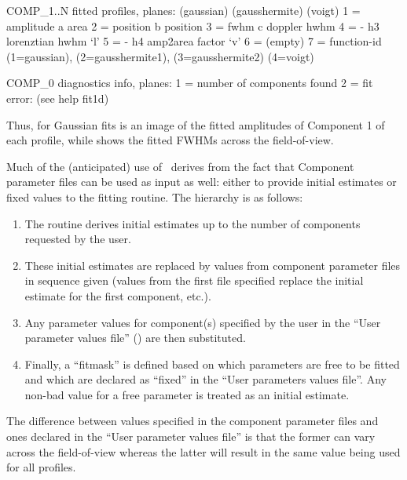 \documentclass[oneside,11pt]{starlink}
\begin{document}
\begin{terminalv}
    COMP_1..N fitted profiles, planes:
               (gaussian)          (gausshermite)        (voigt)
         1 =   amplitude                a                 area
         2 =   position                 b               position
         3 =     fwhm                   c             doppler hwhm
         4 =       -                    h3           lorenztian hwhm `l'
         5 =       -                    h4           amp2area factor `v'
         6 =   (empty)
         7 = function-id (1=gaussian), (2=gausshermite1), (3=gausshermite2)
                         (4=voigt)

    COMP_0 diagnostics info, planes:
         1 = number of components found
         2 = fit error: (see help fit1d)
\end{terminalv}

Thus, for Gaussian fits  is
an image of the fitted amplitudes of Component 1 of each profile,
while  shows the fitted FWHMs
across the field-of-view.

Much of the (anticipated) use of \fitdd\ derives from the fact that
Component parameter files can be used as input as well: either to
provide initial estimates or fixed values to the fitting routine.
The hierarchy is as follows:
\begin{enumerate}
\item The routine derives initial estimates up to the number of components
requested by the user.
\item These initial estimates are replaced by values from component parameter
files in sequence given (values from the first file specified replace
the initial estimate for the first component, etc.).
\item Any parameter values for component(s) specified by the user in
the ``User parameter values file'' () are then substituted.
\item Finally, a ``fitmask'' is defined based on which parameters are
free to be fitted and which are declared as ``fixed'' in the ``User
parameters values file''. Any non-bad value for a free parameter is treated
as an initial estimate.
\end{enumerate}

The difference between values specified in the component parameter
files and ones declared in the ``User parameter values file'' is that
the former can vary across the field-of-view whereas the latter will
result in the same value being used for all profiles.
\end{document}
